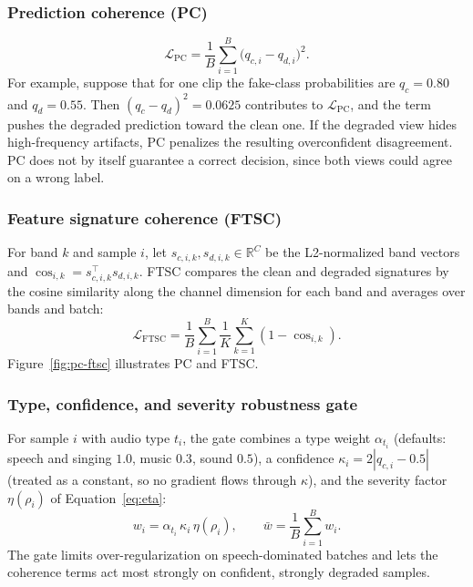 \subsubsection{Prediction coherence (PC)}

\begin{equation}
\mathcal{L}_{\mathrm{PC}} = \frac{1}{B}\sum_{i=1}^{B} \big(q_{c,i} - q_{d,i}\big)^2 .
\label{eq:pc}
\end{equation}
For example, suppose that for one clip the fake-class probabilities are $q_c = 0.80$ and $q_d = 0.55$. Then $(q_c - q_d)^2 = 0.0625$ contributes to $\mathcal{L}_{\mathrm{PC}}$, and the term pushes the degraded prediction toward the clean one. If the degraded view hides high-frequency artifacts, PC penalizes the resulting overconfident disagreement. PC does not by itself guarantee a correct decision, since both views could agree on a wrong label.

\subsubsection{Feature signature coherence (FTSC)}

For band $k$ and sample $i$, let $s_{c,i,k}, s_{d,i,k} \in \mathbb{R}^{C}$ be the L2-normalized band vectors and $\cos_{i,k} = s_{c,i,k}^\top s_{d,i,k}$. FTSC compares the clean and degraded signatures by the cosine similarity along the channel dimension for each band and averages over bands and batch:
\begin{equation}
\mathcal{L}_{\mathrm{FTSC}} = \frac{1}{B}\sum_{i=1}^{B} \frac{1}{K}\sum_{k=1}^{K} (1 - \cos_{i,k}).
\label{eq:ftsc}
\end{equation}
Figure~\ref{fig:pc-ftsc} illustrates PC and FTSC.


\subsubsection{Type, confidence, and severity robustness gate}

For sample $i$ with audio type $t_i$, the gate combines a type weight $\alpha_{t_i}$ (defaults: speech and singing $1.0$, music $0.3$, sound $0.5$), a confidence $\kappa_i = 2|q_{c,i} - 0.5|$ (treated as a constant, so no gradient flows through $\kappa$), and the severity factor $\eta(\rho_i)$ of Equation~\eqref{eq:eta}:
\begin{equation}
w_i = \alpha_{t_i}\,\kappa_i\,\eta(\rho_i), \qquad \bar{w} = \frac{1}{B}\sum_{i=1}^{B} w_i .
\label{eq:gate}
\end{equation}
The gate limits over-regularization on speech-dominated batches and lets the coherence terms act most strongly on confident, strongly degraded samples.


